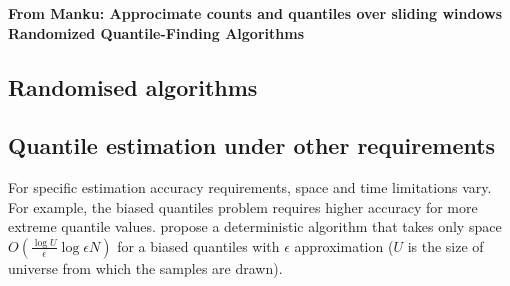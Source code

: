 \textbf{ From Manku: Approcimate counts and quantiles over sliding windows
    Randomized Quantile-Finding Algorithms
}

\iffalse

\subsection{Randomised algorithms}
\label{randomised}


\subsection{Quantile estimation under other requirements}
\label{other}
For specific estimation accuracy requirements, space and time limitations vary. For example, the biased quantiles problem requires higher accuracy for more extreme quantile values. \citeauthor{cormodeSpaceTimeefficientDeterministic2006} \cite{cormodeSpaceTimeefficientDeterministic2006} propose a deterministic algorithm that takes only space $O(\frac{\log {U}}{\epsilon} \log {\epsilon N})$ for a biased quantiles with $\epsilon$ approximation ($U$ is the size of universe from which the samples are drawn). 

